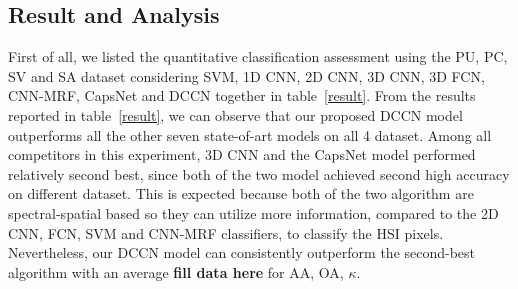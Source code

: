 \documentclass{article}
\begin{document}
	\subsection{Result and Analysis}\label{subsec:result-and-analysis}
	First of all, we listed the quantitative classification assessment using the PU, PC, SV and SA dataset considering
	SVM,
	1D CNN\cite{hu2015deep},
	2D CNN\cite{liu2017semi},
	3D CNN\cite{hamida20183},
	3D FCN\cite{lee2016contextual},
	CNN-MRF\cite{cao2018hyperspectral},
	CapsNet and DCCN together in table~\ref{result}.
	From the results reported in table~\ref{result}, we can observe that our proposed DCCN model outperforms all the
	other seven state-of-art models on all 4 dataset.
	Among all competitors in this experiment, 3D CNN\cite{hamida20183} and the CapsNet model performed relatively second
	best, since both of the two model achieved second high accuracy on different dataset.
	This is expected because both of the two algorithm are spectral-spatial based so they can utilize more information,
	compared to the 2D CNN, FCN, SVM and CNN-MRF classifiers, to classify the HSI pixels.
	Nevertheless, our DCCN model can consistently outperform the second-best algorithm with an average \textbf{fill data
	here} for AA, OA, $\kappa$.
\end{document}
